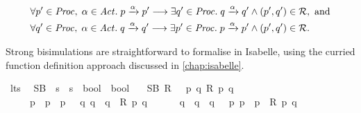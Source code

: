 \begin{isabellebody}
\begin{isamarkuptext}
\begin{align*}
&\forall p' \in \mathit{Proc},\; \alpha \in \mathit{Act} .\; p \xrightarrow{\alpha} p' \longrightarrow
\exists q' \in \mathit{Proc} .\; q \xrightarrow{\alpha} q' \wedge (p',q') \in \mathcal{R}, \text{ and}\\
&\forall q' \in \mathit{Proc},\; \alpha \in \mathit{Act} .\; q \xrightarrow{\alpha} q' \longrightarrow
\exists p' \in \mathit{Proc} .\; p \xrightarrow{\alpha} p' \wedge (p',q') \in \mathcal{R}.
\end{align*}%
\end{isamarkuptext}\isamarkuptrue%
%
\isadelimdocument
%
\endisadelimdocument
%
\isatagdocument
%
\isamarkuptrue%
%
\endisatagdocument
{\isafolddocument}%
%
\isadelimdocument
%
\endisadelimdocument
%
\begin{isamarkuptext}%
Strong bisimulations are straightforward to formalise in Isabelle, using the curried function definition approach discussed in \cref{chap:isabelle}.%
\end{isamarkuptext}\isamarkuptrue%
\isamarkupfalse%
\ lts\ \isanewline
\isanewline
%
\isanewline
{}\isamarkupfalse%
\ SB\ {\isacharcolon}{\kern0pt}{\isacharcolon}{\kern0pt}\ {\isacartoucheopen}{\isacharparenleft}{\kern0pt}{\isacharprime}{\kern0pt}s\ {\isasymRightarrow}\ {\isacharprime}{\kern0pt}s\ {\isasymRightarrow}\ bool{\isacharparenright}{\kern0pt}\ {\isasymRightarrow}\ bool{\isacartoucheclose}\isanewline
\ \ \ {\isacartoucheopen}SB\ R\ {\isasymequiv}\ {\isasymforall}\ p\ q{\isachardot}{\kern0pt}\ R\ p\ q\ {\isasymlongrightarrow}\ \isanewline
\ \ \ \ {\isacharparenleft}{\kern0pt}{\isasymforall}\ p{\isacharprime}{\kern0pt}\ {\isasymalpha}{\isachardot}{\kern0pt}\ p\ {\isasymlongmapsto}{\isasymalpha}\ p{\isacharprime}{\kern0pt}\ {\isasymlongrightarrow}\ {\isacharparenleft}{\kern0pt}{\isasymexists}\ q{\isacharprime}{\kern0pt}{\isachardot}{\kern0pt}\ {\isacharparenleft}{\kern0pt}q\ {\isasymlongmapsto}{\isasymalpha}\ q{\isacharprime}{\kern0pt}{\isacharparenright}{\kern0pt}\ {\isasymand}\ R\ p{\isacharprime}{\kern0pt}\ q{\isacharprime}{\kern0pt}{\isacharparenright}{\kern0pt}{\isacharparenright}{\kern0pt}\ {\isasymand}\isanewline
\ \ \ \ {\isacharparenleft}{\kern0pt}{\isasymforall}\ q{\isacharprime}{\kern0pt}\ {\isasymalpha}{\isachardot}{\kern0pt}\ q\ {\isasymlongmapsto}{\isasymalpha}\ q{\isacharprime}{\kern0pt}\ {\isasymlongrightarrow}\ {\isacharparenleft}{\kern0pt}{\isasymexists}\ p{\isacharprime}{\kern0pt}{\isachardot}{\kern0pt}\ {\isacharparenleft}{\kern0pt}p\ {\isasymlongmapsto}{\isasymalpha}\ p{\isacharprime}{\kern0pt}{\isacharparenright}{\kern0pt}\ {\isasymand}\ R\ p{\isacharprime}{\kern0pt}\ q{\isacharprime}{\kern0pt}{\isacharparenright}{\kern0pt}{\isacharparenright}{\kern0pt}{\isacartoucheclose}%

\end{isabellebody}
